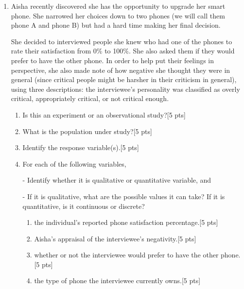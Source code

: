 \documentclass[11pt]{article}\usepackage[]{graphicx}\usepackage[]{color}
\begin{document}
\begin{enumerate}
   \item Aisha recently discovered she has the opportunity to upgrade her smart phone. She narrowed her choices down to two phones (we will call them phone A and phone B) but had a hard time making her final decision.
  
She decided to interviewed people she knew who had one of the phones to rate their satisfaction from 0\% to 100\%.
She also asked them if they would prefer to have the other phone.
In order to help put their feelings in perspective, she also made note of how negative she thought they were in general (since critical people might be harsher in their criticism in general),
using three descriptions: the interviewee's personality was classified as overly critical, appropriately critical, or not critical enough. 

\begin{enumerate}
   \item Is this an experiment or an observational study?[5 pts]

   \item What is the population under study?[5 pts]

   \item Identify the response variable(s).[5 pts]

   \item For each of the following variables, 



      - Identify whether it is qualitative or quantitative variable, and 

      - If it is qualitative, what are the possible values it can take? If it is quantitative, is it continuous or discrete?



   \begin{enumerate}

      \item the individual's reported phone satisfaction percentage.[5 pts]


      \item Aisha's appraisal of the interviewee's negativity.[5 pts]


      \item whether or not the interviewee would prefer to have the other phone.[5 pts]


      \item the type of phone the interviewee currently owns.[5 pts]
   \end{enumerate}
\end{enumerate}


\end{enumerate}
\end{document}
